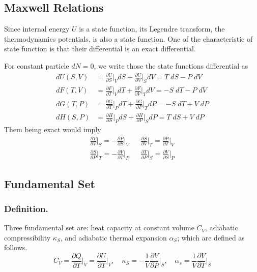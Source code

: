 \documentclass[../../../Main.tex]{subfiles}
\begin{document}
\subsection{Maxwell Relations}
Since internal energy $U$ is a state function, its Legendre transform, the thermodynamics potentials, is also a state function. One of the characteristic of state function is that their differential is an exact differential. 

For constant particle $dN=0$, we write those the state functions differential as 
\begin{align*}
    dU(S,V)&=\frac{\partial U}{\partial S}\bigg|_V dS+\frac{\partial U}{\partial V}\bigg|_S dV= T\;dS-P\;dV\\
    dF(T, V ) &=\frac{\partial F}{\partial T}\bigg|_V dT+\frac{\partial F}{\partial V}\bigg|_T dV=  -S\;dT - P\;dV\\
    dG(T, P)&=\frac{\partial G}{\partial T}\bigg|_P dT+\frac{\partial G}{\partial P}\bigg|_T dP= -S\;dT + V\; d P\\
    dH (S, P) &=\frac{\partial H}{\partial S}\bigg|_P dS+\frac{\partial H}{\partial P}\bigg|_S dP=  T\; dS + V \;d P
\end{align*}
Them being exact would imply
\begin{align*}
    \frac{\partial T}{\partial V}\bigg|_S=-\frac{\partial P}{\partial S}\bigg|_V
    &&
    \frac{\partial S}{\partial V}\bigg|_T=\frac{\partial P}{\partial T}\bigg|_V \\
    \frac{\partial S}{\partial P}\bigg|_T  =-\frac{\partial V}{\partial T}\bigg|_P  
    &&
    \frac{\partial T}{\partial P}\bigg|_S =\frac{\partial V}{\partial S}\bigg|_P
\end{align*}

\subsection{Fundamental Set}
\subsubsection{Definition.} Three fundamental set are: heat capacity at constant volume $C_V$, adiabatic compressibility $\kappa_S$, and adiabatic thermal expansion $\alpha_S$; which are defined as follows.
\begin{equation*}
    C_V=\frac{\partial Q}{\partial T}\bigg|_V=\frac{\partial U}{\partial T}\bigg|_V,\quad 
    \kappa_S=-\frac{1}{V}\frac{\partial V}{\partial P}\bigg|_S,\quad
    \alpha_s=\frac{1}{V}\frac{\partial V}{\partial T}\bigg|_S
\end{equation*}
\end{document}
